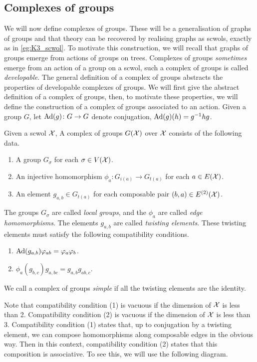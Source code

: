 \subsection{Complexes of groups}
We will now define complexes of groups.
These will be a generalisation of graphs of groups and that theory can be recovered by realising graphs as scwols, exactly as in \cref{eg:K3_scwol}.
To motivate this construction, we will recall that graphs of groups emerge from actions of groups on trees.
Complexes of groups \emph{sometimes} emerge from an action of a group on a scwol, such a complex of groups is called \emph{developable}.
The general definition of a complex of groups abstracts the properties of developable complexes of groups.
We will first give the abstract definition of a complex of groups, then, to motivate these properties, we will define the construction of a complex of groups associated to an action.
Given a group $G$, let $\operatorname{Ad}(g) \colon G \to G$ denote conjugation, $\operatorname{Ad}(g)(h) = g^{-1}hg$.

\begin{definition}
	Given a scwol $\mathcal{X}$, A complex of groups $G(\mathcal{X})$ over $\mathcal{X}$ consists of the following data.
	\begin{enumerate}
		\item A group $G_\sigma$ for each $\sigma \in V(\mathcal{X})$.
		\item An injective homomorphism $\phi_a \colon G_{i(a)} \to G_{t(a)}$ for each $a \in E(\mathcal{X})$.
		\item An element $g_{a,b} \in G_{t(a)}$ for each composable pair $(b,a) \in E^{(2)}(\mathcal{X})$.
	\end{enumerate}
	The groups $G_\sigma$ are called \emph{local groups}, and the $\phi_a$ are called \emph{edge homomorphisms}.
	The elements $g_{a,b}$ are called \emph{twisting elements}.
	These twisting elements must satisfy the following compatibility conditions.
	\begin{enumerate}
		\item $\operatorname{Ad}(g_{a,b}) \varphi_{ab} = \varphi_a \varphi_b$.
		\item $\phi_a(g_{b,c})g_{a,bc} = g_{a,b}g_{ab,c}$.
	\end{enumerate}
	We call a complex of groups \emph{simple} if all the twisting elements are the identity.
	\label{def:complex_of_groups}
\end{definition}

Note that compatibility condition (1) is vacuous if the dimension of $\mathcal{X}$ is less than 2.
Compatibility condition (2) is vacuous if the dimension of  $\mathcal{X}$ is less than 3.
Compatibility condition (1) states that, up to conjugation by a twisting element, we can compose homomorphisms along composable edges in the obvious way.
Then in this context, compatibility condition (2) states that this composition is associative.
To see this, we will use the following diagram.

